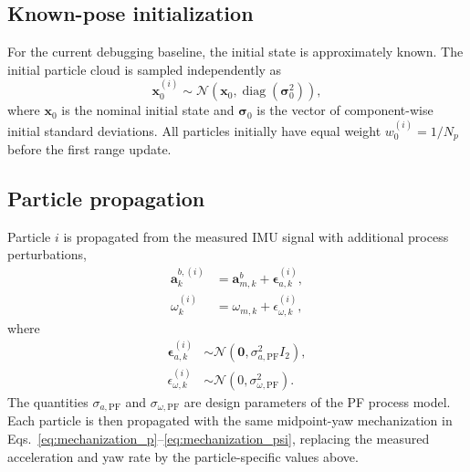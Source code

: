 \subsection{Known-pose initialization}
For the current debugging baseline, the initial state is approximately known. The initial particle cloud is sampled independently as
\begin{equation}
\bm{x}_0^{(i)}\sim
\mathcal{N}\!\left(\bm{x}_0,\operatorname{diag}(\bm{\sigma}_0^2)\right),
\end{equation}
where $\bm{x}_0$ is the nominal initial state and $\bm{\sigma}_0$ is the vector of component-wise initial standard deviations. All particles initially have equal weight $w_0^{(i)}=1/N_p$ before the first range update.

\subsection{Particle propagation}
Particle $i$ is propagated from the measured IMU signal with additional process perturbations,
\begin{align}
\bm{a}_{k}^{b,(i)} &= \bm{a}_{m,k}^{b}+\bm{\epsilon}_{a,k}^{(i)},\\
\omega_{k}^{(i)} &= \omega_{m,k}+\epsilon_{\omega,k}^{(i)},
\end{align}
where
\begin{align}
\bm{\epsilon}_{a,k}^{(i)} &\sim \mathcal{N}(\bm{0},\sigma_{a,\mathrm{PF}}^2I_2),\\
\epsilon_{\omega,k}^{(i)} &\sim \mathcal{N}(0,\sigma_{\omega,\mathrm{PF}}^2).
\end{align}
The quantities $\sigma_{a,\mathrm{PF}}$ and $\sigma_{\omega,\mathrm{PF}}$ are design parameters of the PF process model. Each particle is then propagated with the same midpoint-yaw mechanization in Eqs.~\eqref{eq:mechanization_p}--\eqref{eq:mechanization_psi}, replacing the measured acceleration and yaw rate by the particle-specific values above.

